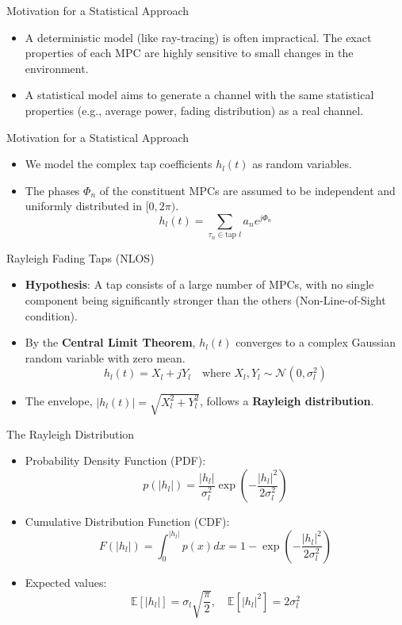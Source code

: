 \documentclass{beamer}
\begin{document}
	\begin{frame}{Motivation for a Statistical Approach}
		\begin{itemize}
			\item A deterministic model (like ray-tracing) is often impractical. The exact properties of each MPC are highly sensitive to small changes in the environment.
			\item A statistical model aims to generate a channel with the same statistical properties (e.g., average power, fading distribution) as a real channel.
		\end{itemize}
	\end{frame}
	
	\begin{frame}{Motivation for a Statistical Approach}
		\begin{itemize}
			\item We model the complex tap coefficients $h_l(t)$ as random variables.
			\item The phases $\Phi_n$ of the constituent MPCs are assumed to be independent and uniformly distributed in $[0, 2\pi)$.
			\[ h_l(t) = \sum_{\tau_n \in \text{tap } l} a_n e^{j\Phi_n} \]
		\end{itemize}
	\end{frame}
	
	\begin{frame}{Rayleigh Fading Taps (NLOS)}
		\begin{itemize}
			\item \textbf{Hypothesis}: A tap consists of a large number of MPCs, with no single component being significantly stronger than the others (Non-Line-of-Sight condition).
			
			\item By the \textbf{Central Limit Theorem}, $h_l(t)$ converges to a complex Gaussian random variable with zero mean.
			\[ h_l(t) = X_l + jY_l \quad \text{where } X_l, Y_l \sim \mathcal{N}(0, \sigma_l^2) \]
			
			\item The envelope, $|h_l(t)| = \sqrt{X_l^2 + Y_l^2}$, follows a \textbf{Rayleigh distribution}.
		\end{itemize}
	\end{frame}
	
	\begin{frame}{The Rayleigh Distribution}
		\begin{itemize}
			\item Probability Density Function (PDF):
			\[ p(|h_l|) = \frac{|h_l|}{\sigma_l^2} \exp\left(-\frac{|h_l|^2}{2\sigma_l^2}\right) \]
			
			\item Cumulative Distribution Function (CDF):
			\[ F(|h_l|) = \int_0^{|h_l|} p(x) dx = 1 - \exp\left(-\frac{|h_l|^2}{2\sigma_l^2}\right) \]
			
			\item Expected values:
			\[ \mathbb{E}[|h_l|] = \sigma_l \sqrt{\frac{\pi}{2}}, \quad \mathbb{E}[|h_l|^2] = 2\sigma_l^2 \]
		\end{itemize}
	\end{frame}
	
\end{document}
